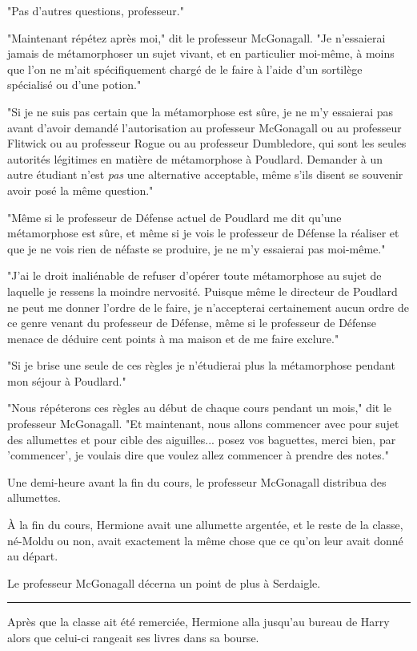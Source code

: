 "Pas d'autres questions, professeur."

"Maintenant répétez après moi," dit le professeur McGonagall. "Je n'essaierai jamais de métamorphoser un sujet vivant, et en particulier moi-même, à moins que l'on ne m'ait spécifiquement chargé de le faire à l'aide d'un sortilège spécialisé ou d'une potion."

"Si je ne suis pas certain que la métamorphose est sûre, je ne m'y essaierai pas avant d'avoir demandé l'autorisation au professeur McGonagall ou au professeur Flitwick ou au professeur Rogue ou au professeur Dumbledore, qui sont les seules autorités légitimes en matière de métamorphose à Poudlard. Demander à un autre étudiant n'est \emph{pas}  une alternative acceptable, même s'ils disent se souvenir avoir posé la même question."

"Même si le professeur de Défense actuel de Poudlard me dit qu'une métamorphose est sûre, et même si je vois le professeur de Défense la réaliser et que je ne vois rien de néfaste se produire, je ne m'y essaierai pas moi-même."

"J'ai le droit inaliénable de refuser d'opérer toute métamorphose au sujet de laquelle je ressens la moindre nervosité. Puisque même le directeur de Poudlard ne peut me donner l'ordre de le faire, je n'accepterai certainement aucun ordre de ce genre venant du professeur de Défense, même si le professeur de Défense menace de déduire cent points à ma maison et de me faire exclure."

"Si je brise une seule de ces règles je n'étudierai plus la métamorphose pendant mon séjour à Poudlard."

"Nous répéterons ces règles au début de chaque cours pendant un mois," dit le professeur McGonagall. "Et maintenant, nous allons commencer avec pour sujet des allumettes et pour cible des aiguilles... posez vos baguettes, merci bien, par 'commencer', je voulais dire que voulez allez commencer à prendre des notes."

Une demi-heure avant la fin du cours, le professeur McGonagall distribua des allumettes.

À la fin du cours, Hermione avait une allumette argentée, et le reste de la classe, né-Moldu ou non, avait exactement la même chose que ce qu'on leur avait donné au départ.

Le professeur McGonagall décerna un point de plus à Serdaigle.
\par\noindent\rule{\textwidth}{0.4pt}
Après que la classe ait été remerciée, Hermione alla jusqu'au bureau de Harry alors que celui-ci rangeait ses livres dans sa bourse.

